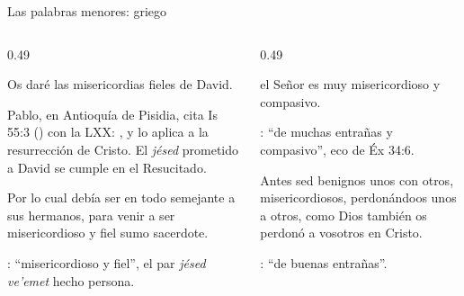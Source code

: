\begin{frame}{Las palabras menores: griego}
\begin{columns}[t,onlytextwidth]
\begin{column}{0.49\textwidth}
\begin{cita}Os daré las misericordias fieles de David.\end{cita}
\scriptsize Pablo, en Antioquía de Pisidia, cita Is 55:3 () con la LXX: , y lo aplica a la resurrección de Cristo. El \emph{jésed} prometido a David se cumple en el Resucitado.
\begin{cita}Por lo cual debía ser en todo semejante a sus hermanos, para venir a ser misericordioso y fiel sumo sacerdote.\end{cita}
\scriptsize{}: ``misericordioso y fiel'', el par \emph{jésed ve'emet} hecho persona.
\end{column}
\begin{column}{0.49\textwidth}
\begin{cita}el Señor es muy misericordioso y compasivo.\end{cita}
\scriptsize{}: ``de muchas entrañas y compasivo'', eco de Éx 34:6.
\begin{cita}Antes sed benignos unos con otros, misericordiosos, perdonándoos unos a otros, como Dios también os perdonó a vosotros en Cristo.\end{cita}
\scriptsize{}: ``de buenas entrañas''.
\end{column}
\end{columns}
\end{frame}


